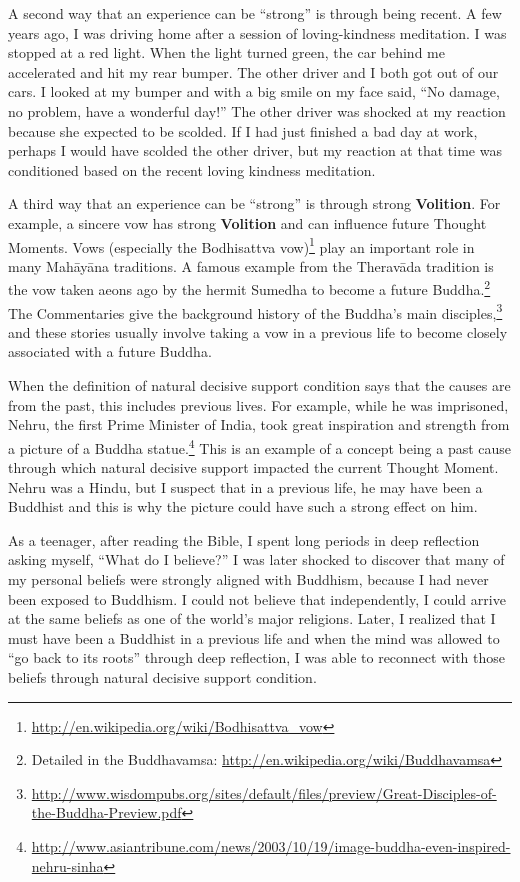A second way that an experience can be “strong” is through being recent. A few years ago, I was driving home after a session of loving-kindness meditation. I was stopped at a red light. When the light turned green, the car behind me accelerated and hit my rear bumper. The other driver and I both got out of our cars. I looked at my bumper and with a big smile on my face said, “No damage, no problem, have a wonderful day!” The other driver was shocked at my reaction because she expected to be scolded. If I had just finished a bad day at work, perhaps I would have scolded the other driver, but my reaction at that time was conditioned based on the recent loving kindness meditation.

A third way that an experience can be “strong” is through strong \textbf{Volition}. For example, a sincere vow has strong \textbf{Volition} and can influence future Thought Moments. Vows (especially the Bodhisattva vow)\footnote{\url{http://en.wikipedia.org/wiki/Bodhisattva_vow}} play an important role in many Mahāyāna traditions. A famous example from the Theravāda tradition is the vow taken aeons ago by the hermit Sumedha to become a future Buddha.\footnote{Detailed in the Buddhavamsa: \url{http://en.wikipedia.org/wiki/Buddhavamsa}} The Commentaries give the background history of the Buddha’s main disciples,\footnote{\url{http://www.wisdompubs.org/sites/default/files/preview/Great-Disciples-of-the-Buddha-Preview.pdf}} and these stories usually involve taking a vow in a previous life to become closely associated with a future Buddha.

When the definition of natural decisive support condition says that the causes are from the past, this includes previous lives. For example, while he was imprisoned, Nehru, the first Prime Minister of India, took great inspiration and strength from a picture of a Buddha statue.\footnote{\url{http://www.asiantribune.com/news/2003/10/19/image-buddha-even-inspired-nehru-sinha}} This is an example of a concept being a past cause through which natural decisive support impacted the current Thought Moment. Nehru was a Hindu, but I suspect that in a previous life, he may have been a Buddhist and this is why the picture could have such a strong effect on him. 

As a teenager, after reading the Bible, I spent long periods in deep reflection asking myself, “What do I believe?” I was later shocked to discover that many of my personal beliefs were strongly aligned with Buddhism, because I had never been exposed to Buddhism. I could not believe that independently, I could arrive at the same beliefs as one of the world’s major religions. Later, I realized that I must have been a Buddhist in a previous life and when the mind was allowed to “go back to its roots” through deep reflection, I was able to reconnect with those beliefs through natural decisive support condition.

